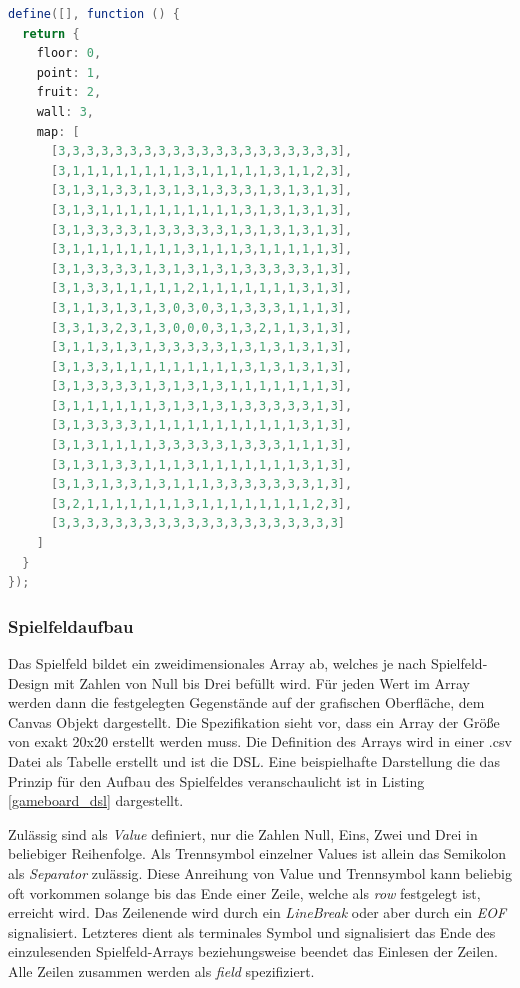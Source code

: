 \documentclass[conference]{IEEEtran}
\begin{document}
\begin{lstlisting}[language=Java, captionpos=b, caption=Generierte Level-Klasse in JavaScript, label=leveljs]
define([], function () {
  return {
    floor: 0,
    point: 1,
    fruit: 2,
    wall: 3,
    map: [
      [3,3,3,3,3,3,3,3,3,3,3,3,3,3,3,3,3,3,3,3],
      [3,1,1,1,1,1,1,1,1,3,1,1,1,1,1,3,1,1,2,3],
      [3,1,3,1,3,3,1,3,1,3,1,3,3,3,1,3,1,3,1,3],
      [3,1,3,1,1,1,1,1,1,1,1,1,1,3,1,3,1,3,1,3],
      [3,1,3,3,3,3,1,3,3,3,3,3,1,3,1,3,1,3,1,3],
      [3,1,1,1,1,1,1,1,1,3,1,1,1,3,1,1,1,1,1,3],
      [3,1,3,3,3,3,1,3,1,3,1,3,1,3,3,3,3,3,1,3],
      [3,1,3,3,1,1,1,1,1,2,1,1,1,1,1,1,1,3,1,3],
      [3,1,1,3,1,3,1,3,0,3,0,3,1,3,3,3,1,1,1,3],
      [3,3,1,3,2,3,1,3,0,0,0,3,1,3,2,1,1,3,1,3],
      [3,1,1,3,1,3,1,3,3,3,3,3,1,3,1,3,1,3,1,3],
      [3,1,3,3,1,1,1,1,1,1,1,1,1,3,1,3,1,3,1,3],
      [3,1,3,3,3,3,1,3,1,3,1,3,1,1,1,1,1,1,1,3],
      [3,1,1,1,1,1,1,3,1,3,1,3,1,3,3,3,3,3,1,3],
      [3,1,3,3,3,3,1,1,1,1,1,1,1,1,1,1,1,3,1,3],
      [3,1,3,1,1,1,1,3,3,3,3,3,1,3,3,3,1,1,1,3],
      [3,1,3,1,3,3,1,1,1,3,1,1,1,1,1,1,1,3,1,3],
      [3,1,3,1,3,3,1,3,1,1,1,3,3,3,3,3,3,3,1,3],
      [3,2,1,1,1,1,1,1,1,3,1,1,1,1,1,1,1,1,2,3],
      [3,3,3,3,3,3,3,3,3,3,3,3,3,3,3,3,3,3,3,3]
    ]
  }
});
\end{lstlisting}

\subsubsection{Spielfeldaufbau}
Das Spielfeld bildet ein zweidimensionales Array ab, welches je nach Spielfeld-Design mit Zahlen von Null bis Drei befüllt wird. Für jeden Wert im Array werden dann die festgelegten Gegenstände auf der grafischen Oberfläche, dem Canvas Objekt dargestellt. Die Spezifikation sieht vor, dass ein Array der Größe von exakt 20x20 erstellt werden muss. Die Definition des Arrays wird in einer .csv Datei als Tabelle erstellt und ist die DSL. Eine beispielhafte Darstellung die das Prinzip für den Aufbau des Spielfeldes veranschaulicht ist in Listing \ref{gameboard_dsl} dargestellt.

Zulässig sind als \emph{Value} definiert, nur die Zahlen Null, Eins, Zwei und Drei in beliebiger Reihenfolge. Als Trennsymbol einzelner Values ist allein das Semikolon als \emph{Separator} zulässig. Diese Anreihung von Value und Trennsymbol kann beliebig oft vorkommen solange bis das Ende einer Zeile, welche als \emph{row} festgelegt ist, erreicht wird. Das Zeilenende wird durch ein \emph{LineBreak} oder aber durch ein \emph{EOF} signalisiert. Letzteres dient als terminales Symbol und signalisiert das Ende des einzulesenden Spielfeld-Arrays beziehungsweise beendet das Einlesen der Zeilen. Alle Zeilen zusammen werden als \emph{field} spezifiziert.
\end{document}
